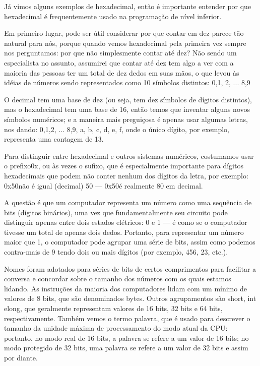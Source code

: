 Já vimos alguns exemplos de hexadecimal, então é importante entender por que hexadecimal é frequentemente usado na programação de nível inferior.

Em primeiro lugar, pode ser útil considerar por que contar em dez parece tão natural para nós, porque quando vemos hexadecimal pela primeira vez sempre nos perguntamos: por que não simplesmente contar até dez? Não sendo um especialista no assunto, assumirei que contar até dez tem algo a ver com a maioria das pessoas ter um total de dez dedos em suas mãos, o que levou às idéias de números sendo representados como 10 símbolos distintos: 0,1, 2, ... 8,9

O decimal tem uma base de dez (ou seja, tem dez símbolos de dígitos distintos), mas o hexadecimal tem uma base de 16, então temos que inventar alguns novos símbolos numéricos; e a maneira mais preguiçosa é apenas usar algumas letras, nos dando: 0,1,2, ... 8,9, a, b, c, d, e, f, onde o único dígito, por exemplo, representa uma contagem de 13.

Para distinguir entre hexadecimal e outros sistemas numéricos, costumamos usar o prefixo0x, ou às vezes o sufixo, que é especialmente importante para dígitos hexadecimais que podem não conter nenhum dos dígitos da letra, por exemplo: 0x50não é igual (decimal) 50 --- 0x50é realmente 80 em decimal.

A questão é que um computador representa um número como uma sequência de bits (dígitos binários), uma vez que fundamentalmente seu circuito pode distinguir apenas entre dois estados elétricos: 0 e 1 --- é como se o computador tivesse um total de apenas dois dedos. Portanto, para representar um número maior que 1, o computador pode agrupar uma série de bits, assim como podemos contra-mais de 9 tendo dois ou mais dígitos (por exemplo, 456, 23, etc.).

Nomes foram adotados para séries de bits de certos comprimentos para facilitar a conversa e concordar sobre o tamanho dos números com os quais estamos lidando. As instruções da maioria dos computadores lidam com um mínimo de valores de 8 bits, que são denominados bytes. Outros agrupamentos são short, int elong, que geralmente representam valores de 16 bits, 32 bits e 64 bits, respectivamente. Também vemos o termo palavra, que é usado para descrever o tamanho da unidade máxima de processamento do modo atual da CPU: portanto, no modo real de 16 bits, a palavra se refere a um valor de 16 bits; no modo protegido de 32 bits, uma palavra se refere a um valor de 32 bits e assim por diante.

